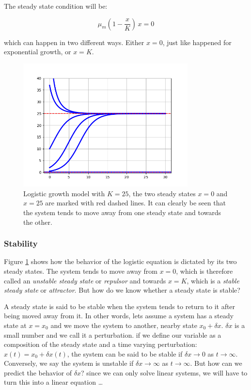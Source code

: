 \documentclass[12pt]{article}
\begin{document}
The steady state condition will be:

\begin{equation}
 \mu_{m} \left(1 - \frac{x}{K} \right) \, x = 0
\end{equation}

which can happen in two different ways. Either $x=0$, just like happened for exponential growth, or $x=K$.

\begin{figure}
	\begin{center}
		\includegraphics[width=0.8\textwidth]{logisticall}
	\end{center}
	\caption{Logistic growth model with $K=25$, the two steady states $x=0$ and $x=25$ are marked with red dashed lines. It can clearly be seen that the system tends to move away from one steady state and towards the other.}
	\label{fig:logisticall}
\end{figure}

\subsubsection{Stability}

Figure \ref{fig:logisticall} shows how the behavior of the logistic equation is dictated by its two steady states. The system tends to move away from $x=0$, which is therefore called an \emph{unstable steady state} or \emph{repulsor} and towards $x=K$, which is a \emph{stable steady state} or \emph{attractor}. But how do we know whether a steady state is stable?

A steady state is said to be stable when the system tends to return to it after being moved away from it. In other words, lets assume a system has a steady state at $x=x_0$ and we move the system to another, nearby state $x_0+\delta x$. $\delta x$ is a small number and we call it a perturbation. if we define our variable as a composition of the steady state and a time varying perturbation: $x(t) = x_0 + \delta x(t)$, the system can be said to be stable if $\delta x \rightarrow 0$ as $t \rightarrow \infty$. Conversely, we say the system is unstable if $\delta x \rightarrow \infty$ as $t \rightarrow \infty$.  But how can we predict the behavior of $\delta x$? since we can only solve linear systems, we will have to turn this into a linear equation \dots
\end{document}
